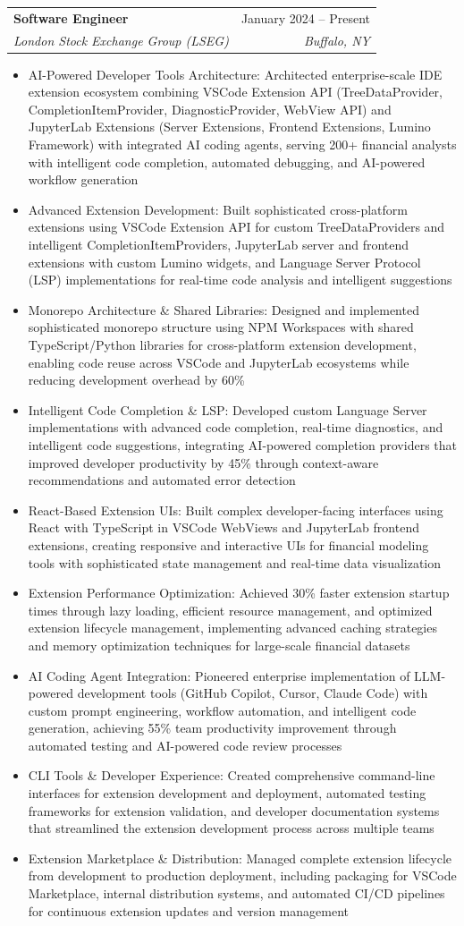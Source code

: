 \documentclass[a4paper,11pt]{article}
\makeatletter
\newcommand{\resumeItem}[1]{
  \item\small{
    {#1 \vspace{-2pt}}
  }
}
\newcommand{\resumeSubheading}[4]{
  \vspace{-2pt}\item
    \begin{tabular*}{0.97\textwidth}[t]{l@{\extracolsep{\fill}}r}
      \textbf{#1} & #2 \\
      \textit{\small#3} & \textit{\small #4} \\
    \end{tabular*}\vspace{-7pt}
}
\newcommand{\resumeItemListStart}{\begin{itemize}}
\newcommand{\resumeItemListEnd}{\end{itemize}\vspace{-5pt}}
\makeatother
\begin{document}
    \resumeSubheading
      {Software Engineer}{January 2024 -- Present}
      {London Stock Exchange Group (LSEG)}{Buffalo, NY}
      \resumeItemListStart
        \resumeItem{AI-Powered Developer Tools Architecture: Architected enterprise-scale IDE extension ecosystem combining VSCode Extension API (TreeDataProvider, CompletionItemProvider, DiagnosticProvider, WebView API) and JupyterLab Extensions (Server Extensions, Frontend Extensions, Lumino Framework) with integrated AI coding agents, serving 200+ financial analysts with intelligent code completion, automated debugging, and AI-powered workflow generation}
        \resumeItem{Advanced Extension Development: Built sophisticated cross-platform extensions using VSCode Extension API for custom TreeDataProviders and intelligent CompletionItemProviders, JupyterLab server and frontend extensions with custom Lumino widgets, and Language Server Protocol (LSP) implementations for real-time code analysis and intelligent suggestions}
        \resumeItem{Monorepo Architecture \& Shared Libraries: Designed and implemented sophisticated monorepo structure using NPM Workspaces with shared TypeScript/Python libraries for cross-platform extension development, enabling code reuse across VSCode and JupyterLab ecosystems while reducing development overhead by 60\%}
        \resumeItem{Intelligent Code Completion \& LSP: Developed custom Language Server implementations with advanced code completion, real-time diagnostics, and intelligent code suggestions, integrating AI-powered completion providers that improved developer productivity by 45\% through context-aware recommendations and automated error detection}
        \resumeItem{React-Based Extension UIs: Built complex developer-facing interfaces using React with TypeScript in VSCode WebViews and JupyterLab frontend extensions, creating responsive and interactive UIs for financial modeling tools with sophisticated state management and real-time data visualization}
        \resumeItem{Extension Performance Optimization: Achieved 30\% faster extension startup times through lazy loading, efficient resource management, and optimized extension lifecycle management, implementing advanced caching strategies and memory optimization techniques for large-scale financial datasets}
        \resumeItem{AI Coding Agent Integration: Pioneered enterprise implementation of LLM-powered development tools (GitHub Copilot, Cursor, Claude Code) with custom prompt engineering, workflow automation, and intelligent code generation, achieving 55\% team productivity improvement through automated testing and AI-powered code review processes}
        \resumeItem{CLI Tools \& Developer Experience: Created comprehensive command-line interfaces for extension development and deployment, automated testing frameworks for extension validation, and developer documentation systems that streamlined the extension development process across multiple teams}
        \resumeItem{Extension Marketplace \& Distribution: Managed complete extension lifecycle from development to production deployment, including packaging for VSCode Marketplace, internal distribution systems, and automated CI/CD pipelines for continuous extension updates and version management}
      \resumeItemListEnd
\end{document}
